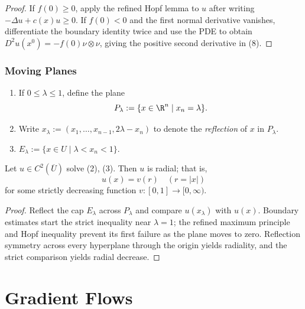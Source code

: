\begin{proof}
\sketch If $f(0)\geq0$, apply the refined Hopf lemma to $u$ after writing $-\Delta u+c(x)u\geq0$. If $f(0)<0$ and the first normal derivative vanishes, differentiate the boundary identity twice and use the PDE to obtain $D^2u(x^0)=-f(0)\nu\otimes\nu$, giving the positive second derivative in (8).
\end{proof}

\subsubsection{Moving Planes}
\label{sec:moving-planes}

\begin{definition}
\label{def:moving-plane-notation}
\begin{enumerate}
\item[(i)] If $0 \le \lambda \le 1$, define the plane
\[
P_\lambda := \{x \in \R^n \mid x_n = \lambda\}.
\]
\item[(ii)] Write $x_\lambda := (x_1, \ldots, x_{n-1}, 2\lambda - x_n)$ to denote the \textit{reflection} of $x$ in $P_\lambda$.
\item[(iii)] $E_\lambda := \{x \in U \mid \lambda < x_n < 1\}$.
\end{enumerate}
\end{definition}

\begin{theorem}
\label{thm:radial-symmetry-positive-solutions}
Let $u \in C^2(\overline{U})$ solve (2), (3). Then $u$ is radial; that is,
\[
u(x) = v(r) \quad (r = |x|)
\]
for some strictly decreasing function $v : [0, 1] \to [0, \infty)$.
\end{theorem}

\begin{proof}
\sketch Reflect the cap $E_\lambda$ across $P_\lambda$ and compare $u(x_\lambda)$ with $u(x)$. Boundary estimates start the strict inequality near $\lambda=1$; the refined maximum principle and Hopf inequality prevent its first failure as the plane moves to zero. Reflection symmetry across every hyperplane through the origin yields radiality, and the strict comparison yields radial decrease.
\end{proof}

\section{Gradient Flows}
\label{sec:gradient-flows}

